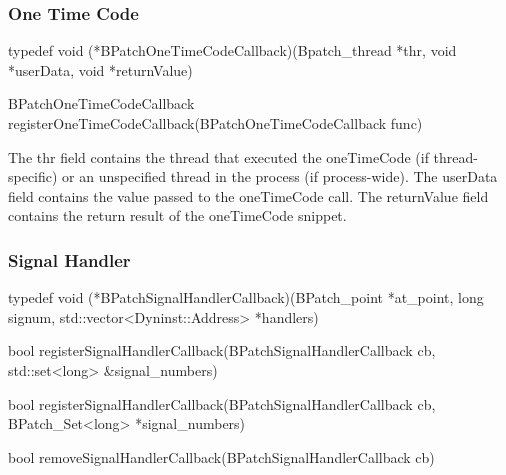 \subsubsection{One Time Code}

\begin{apient}
typedef void (*BPatchOneTimeCodeCallback)(Bpatch_thread *thr, void *userData, void *returnValue)
\end{apient}

\begin{apient}
BPatchOneTimeCodeCallback registerOneTimeCodeCallback(BPatchOneTimeCodeCallback func)
\end{apient}

\begin{apidesc}
The thr field contains the thread that executed the oneTimeCode (if thread-specific) or an unspecified thread in the
process (if process-wide). The userData field contains the value passed to the oneTimeCode call. The returnValue
field contains the return result of the oneTimeCode snippet.
\end{apidesc}

\subsubsection{Signal Handler}

\begin{apient}
typedef void (*BPatchSignalHandlerCallback)(BPatch_point *at_point, long signum, std::vector<Dyninst::Address> *handlers)
\end{apient}

\begin{apient}
bool registerSignalHandlerCallback(BPatchSignalHandlerCallback cb, std::set<long> &signal_numbers)
\end{apient}

\begin{apient}
bool registerSignalHandlerCallback(BPatchSignalHandlerCallback cb, BPatch_Set<long> *signal_numbers)
\end{apient}

\begin{apient}
bool removeSignalHandlerCallback(BPatchSignalHandlerCallback cb)
\end{apient}

